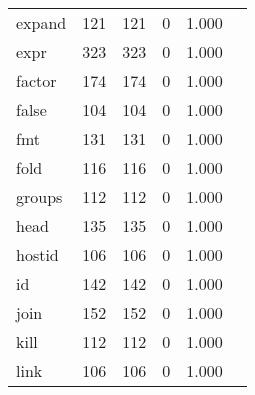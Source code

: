 \begin{longtable}{lp{2.4cm}p{2.4cm}p{2.4cm}p{2.4cm}p{2.4cm}}
expand    &                                    121 &                             121 &                                0 &                                       1.000 \\
expr      &                                    323 &                             323 &                                0 &                                       1.000 \\
factor    &                                    174 &                             174 &                                0 &                                       1.000 \\
false     &                                    104 &                             104 &                                0 &                                       1.000 \\
fmt       &                                    131 &                             131 &                                0 &                                       1.000 \\
fold      &                                    116 &                             116 &                                0 &                                       1.000 \\
groups    &                                    112 &                             112 &                                0 &                                       1.000 \\
head      &                                    135 &                             135 &                                0 &                                       1.000 \\
hostid    &                                    106 &                             106 &                                0 &                                       1.000 \\
id        &                                    142 &                             142 &                                0 &                                       1.000 \\
join      &                                    152 &                             152 &                                0 &                                       1.000 \\
kill      &                                    112 &                             112 &                                0 &                                       1.000 \\
link      &                                    106 &                             106 &                                0 &                                       1.000 \\

\end{longtable}
